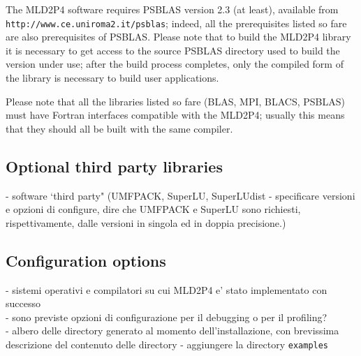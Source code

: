 The MLD2P4 software requires PSBLAS version 2.3 (at least), available
from \verb|http://www.ce.uniroma2.it/psblas|; indeed, all the
prerequisites listed so fare are also prerequisites of PSBLAS. Please
note that to build the MLD2P4 library it is necessary to get access to
the source PSBLAS directory used to build the version under use; after
the build process completes, only the compiled form of the library is
necessary to build user applications.

Please note that all the libraries listed so fare (BLAS, MPI, BLACS,
PSBLAS) must have Fortran interfaces compatible with the MLD2P4;
usually this means that they should all be built with the same
compiler. 


\subsection{Optional third party libraries}

    - software `third party" (UMFPACK, SuperLU, SuperLUdist - specificare versioni e opzioni di 
    configure, dire che UMFPACK e SuperLU sono richiesti, rispettivamente, dalle versioni in 
    singola ed in doppia precisione.)\\
\subsection{Configuration options}
    - sistemi operativi e compilatori su cui MLD2P4 e' stato
    implementato con successo \\
    - sono previste opzioni di configurazione per il debugging o per il profiling? \\
    - albero delle directory generato al momento dell'installazione, con brevissima
    descrizione del contenuto delle directory - aggiungere la directory \texttt{examples}\\
